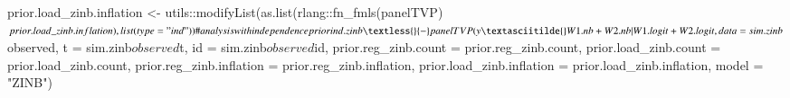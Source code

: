 \documentclass[a4paper, preprint, 3p,
authoryear]{elsarticle} %
\newenvironment{Shaded}{\begin{snugshade}}{\end{snugshade}}
\newcommand{\NormalTok}[1]{#1}
\begin{document}
\begin{Shaded}
\begin{Highlighting}[]
\NormalTok{prior.load\_zinb.inflation \textless{}{-}}
\NormalTok{  utils::modifyList(as.list(rlang::fn\_fmls(panelTVP)$prior.load\_zinb.inflation),}
\NormalTok{                  list(type = "ind"))}

\NormalTok{\# analysis with independence prior}
\NormalTok{ind.zinb \textless{}{-} panelTVP(y \textasciitilde{} W1.nb + W2.nb | W1.logit + W2.logit,}
\NormalTok{                     data = sim.zinb$observed,}
\NormalTok{                     t = sim.zinb$observed$t,}
\NormalTok{                     id = sim.zinb$observed$id,}
\NormalTok{                     prior.reg\_zinb.count = prior.reg\_zinb.count,}
\NormalTok{                     prior.load\_zinb.count = prior.load\_zinb.count,}
\NormalTok{                     prior.reg\_zinb.inflation = prior.reg\_zinb.inflation,}
\NormalTok{                     prior.load\_zinb.inflation = prior.load\_zinb.inflation,}
\NormalTok{                     model = "ZINB")}
\end{Highlighting}
\end{Shaded}


\renewcommand\refname{Conclusion}

\end{document}
